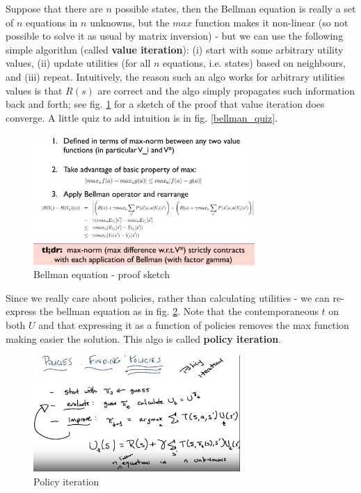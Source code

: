 \documentclass[11pt]{article}
\begin{document}
Suppose that there are $n$ possible states, then the Bellman equation is really a set of $n$ equations in $n$ unknowns, but the $max$ function makes it non-linear (so not possible to solve it as usual by matrix inversion) - but we can use the following simple algorithm (called \textbf{value iteration}): (i) start with some arbitrary utility values, (ii) update utilities (for all $n$ equations, i.e. states) based on neighbours, and (iii) repeat. Intuitively, the reason such an algo works for arbitrary utilities values is that $R(s)$ are correct and the algo simply propagates such information back and forth; see fig. \ref{bellman_solution} for a sketch of the proof that value iteration does converge. A little quiz to add intuition is in fig. \ref{bellman_quiz}.
\begin{figure}[htbp] 
	\centering
	\includegraphics[width=0.75\textwidth]{pics/bellman_solution}
	\caption{Bellman equation - proof sketch} 
	\label{bellman_solution}
\end{figure}

Since we really care about policies, rather than calculating utilities - we can re-express the bellman equation as in fig. \ref{finding_policies}. Note that the contemporaneous $t$ on both $U$ and that expressing it as a function of policies removes the max function making easier the solution. This algo is called \textbf{policy iteration}.
\begin{figure}[htbp] 
	\centering
	\includegraphics[width=0.7\textwidth]{pics/finding_policies}
	\caption{Policy iteration} 
	\label{finding_policies}
\end{figure}
\end{document}
